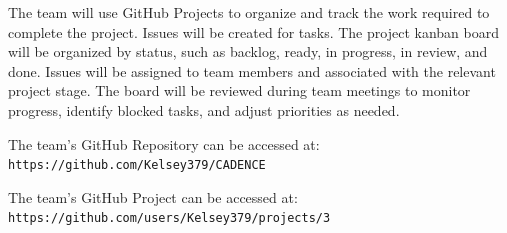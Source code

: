 \documentclass{article}
\begin{document}

The team will use GitHub Projects to organize and track the work required to complete the project. Issues will be created for tasks. The project kanban board will be organized by status, such as backlog, ready, in progress, in review, and done. Issues will be assigned to team members and associated with the relevant project stage. The board will be reviewed during team meetings to monitor progress, identify blocked tasks, and adjust priorities as needed. 

The team's GitHub Repository can be accessed at: \texttt{https://github.com/Kelsey379/CADENCE}

The team's GitHub Project can be accessed at: \texttt{https://github.com/users/Kelsey379/projects/3}
\end{document}
